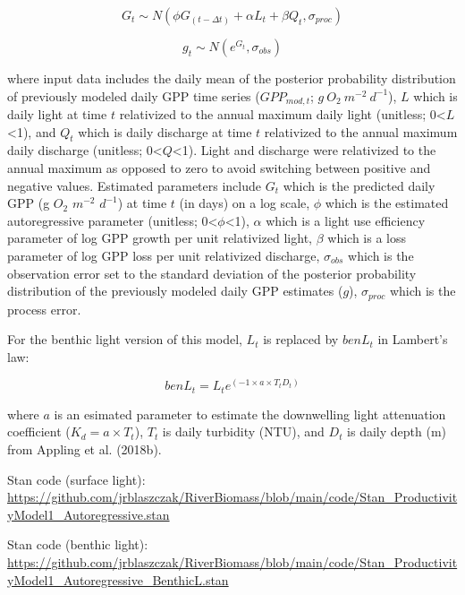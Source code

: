 \documentclass[]{article}
\begin{document}
\begin{equation} 
G_{t} \sim N(\phi G_{(t-\Delta t)}+\alpha L_{t}+\beta Q_{t}, \sigma_{proc})
\end{equation}

\begin{equation} 
g_{t} \sim N(e^{G_{t}},\sigma_{obs})
\end{equation}

where input data includes the daily mean of the posterior probability
distribution of previously modeled daily GPP time series
(\(GPP_{mod,t}\); \(g\ O_{2}\ m^{-2}\ d^{-1}\)), \(L\) which is daily
light at time \(t\) relativized to the annual maximum daily light
(unitless; 0\textless{}\(L\)\textless{}1), and \(Q_t\) which is daily
discharge at time \(t\) relativized to the annual maximum daily
discharge (unitless; 0\textless{}\(Q\)\textless{}1). Light and discharge
were relativized to the annual maximum as opposed to zero to avoid
switching between positive and negative values. Estimated parameters
include \(G_{t}\) which is the predicted daily GPP (g \(O_2\) \(m^{-2}\)
\(d^{-1}\)) at time \(t\) (in days) on a log scale, \(\phi\) which is
the estimated autoregressive parameter (unitless;
0\textless{}\(\phi\)\textless{}1), \(\alpha\) which is a light use
efficiency parameter of log GPP growth per unit relativized light,
\(\beta\) which is a loss parameter of log GPP loss per unit relativized
discharge, \(\sigma_{obs}\) which is the observation error set to the
standard deviation of the posterior probability distribution of the
previously modeled daily GPP estimates (\(g\)), \(\sigma_{proc}\) which
is the process error.

For the benthic light version of this model, \(L_t\) is replaced by
\(benL_t\) in Lambert's law:

\begin{equation}
benL_{t} = L_{t}e^{(-1 \times a \times T_{t} D_{t})}
\end{equation}

where \(a\) is an esimated parameter to estimate the downwelling light
attenuation coefficient (\(K_d = a \times T_{t}\)), \(T_t\) is daily
turbidity (NTU), and \(D_t\) is daily depth (m) from Appling et al.
(2018b).

Stan code (surface light):
\url{https://github.com/jrblaszczak/RiverBiomass/blob/main/code/Stan_ProductivityModel1_Autoregressive.stan}

Stan code (benthic light):
\url{https://github.com/jrblaszczak/RiverBiomass/blob/main/code/Stan_ProductivityModel1_Autoregressive_BenthicL.stan}
\end{document}
